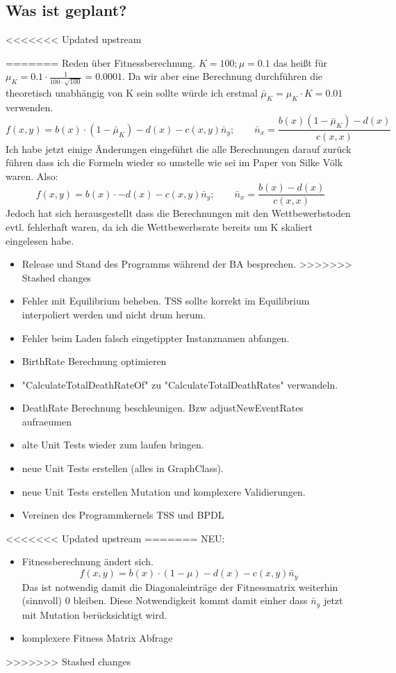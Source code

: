 \documentclass{article}
\begin{document}
\subsection{Was ist geplant?}
<<<<<<< Updated upstream
	\begin{itemize}
=======
	Reden über Fitnessberechnung. $ K = 100; \mu = 0.1 $ das heißt für $ \mu_K = 0.1 \cdot \frac{1}{100\cdot \sqrt{100}} = 0.0001$. Da wir aber eine Berechnung durchführen die theoretisch unabhängig von K sein sollte würde ich erstmal $ \bar{\mu}_K = \mu_K \cdot K = 0.01 $ verwenden.
	\[ f(x,y) = b(x) \cdot (1 - \bar{\mu}_K) - d(x) - c(x,y)\bar{n}_y; \qquad \bar{n}_x = \frac{b(x)(1-\bar{\mu}_K) - d(x)}{c(x,x)}\]
	Ich habe jetzt einige Änderungen eingeführt die alle Berechnungen darauf zurück führen dass ich die Formeln wieder so umstelle wie sei im Paper von Silke Völk waren. Also:
	\[ f(x,y) = b(x) \cdot - d(x) - c(x,y)\bar{n}_y; \qquad \bar{n}_x = \frac{b(x) - d(x)}{c(x,x)}\]
	Jedoch hat sich herausgestellt dass die Berechnungen mit den Wettbewerbstoden evtl. fehlerhaft waren, da ich die Wettbewerbsrate bereits um K skaliert eingelesen habe.
	\begin{itemize}
		\item Release und Stand des Programms während der BA besprechen.
>>>>>>> Stashed changes
		\item Fehler mit Equilibrium beheben. TSS sollte korrekt im Equilibrium interpoliert werden und nicht drum herum. \checkmark
		\item Fehler beim Laden falsch eingetippter Instanznamen abfangen. \checkmark
		\item BirthRate Berechnung optimieren \checkmark
		\item "{}CalculateTotalDeathRateOf"{} zu "{}CalculateTotalDeathRates"{} verwandeln. \checkmark
		\item DeathRate Berechnung beschleunigen. Bzw adjustNewEventRates aufraeumen
		\item alte Unit Tests wieder zum laufen bringen.
		\item neue Unit Tests erstellen (alles in GraphClass).
		\item neue Unit Tests erstellen Mutation und komplexere Validierungen.
		\item Vereinen des Programmkernels TSS und BPDL
	\end{itemize}
<<<<<<< Updated upstream
=======
	NEU:
	\begin{itemize}
		\item Fitnessberechnung ändert sich. 
		\[ f(x,y) = b(x) \cdot (1 - \mu) - d(x) - c(x,y)\bar{n}_y \]
		Das ist notwendig damit die Diagonaleinträge der Fitnessmatrix weiterhin (sinnvoll) 0 bleiben. Diese Notwendigkeit kommt damit einher dass $ \bar{n}_y $ jetzt mit Mutation berücksichtigt wird.
		\item komplexere Fitness Matrix Abfrage
	\end{itemize}
>>>>>>> Stashed changes

\end{itemize}
\end{document}
